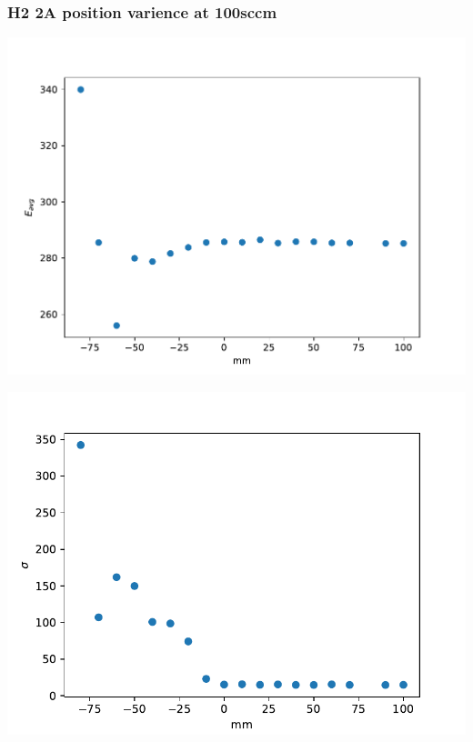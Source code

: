 \documentclass{beamer} %
\begin{document}
\begin{frame}
    \frametitle{H2 2A position varience at 100sccm}
    \begin{minipage}{0.49\textwidth}
        \includegraphics[width=1.1\textwidth]{figures/PosVary_H2_2A_Energy.pdf}
    \end{minipage}
    \begin{minipage}{0.49\textwidth}
        \includegraphics[width=1.1\textwidth]{figures/PosVary_H2_2A_Energy_sigma.pdf}
    \end{minipage}
    \begin{minipage}{0.49\textwidth}

\end{minipage}
\end{frame}
\end{document}
